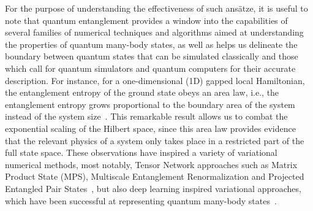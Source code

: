 \documentclass[
 aps,
 pra,
 showpacs,
 showkeys,
 superscriptaddress,
 reprint,%
twocolumn,
]{revtex4-1}
\begin{document}
For the purpose of understanding the effectiveness of such ans\"atze, it is useful to note that quantum entanglement provides a window into the capabilities of several families of numerical techniques and algorithms aimed at understanding the properties of quantum many-body states, as well as helps us delineate the boundary between quantum states that can be simulated classically and those which call for quantum simulators and quantum computers for their accurate description. For instance, for a one-dimensional (1D) gapped local Hamiltonian, the entanglement entropy of the ground state obeys an area law, i.e., the entanglement entropy grows proportional to the boundary area of the system instead of the system size~\cite{Eisert2010arealaw}. This remarkable result allows us to combat the exponential scaling of the Hilbert space, since this area law provides evidence that the relevant physics of a system only takes place in a restricted part of the full state space.  These observations have inspired a variety of variational numerical methods, most notably, Tensor Network approaches such as Matrix Product State (MPS), Multiscale Entanglement Renormalization and Projected Entangled Pair States~\cite{Eisert2013tensornetworks}, but also deep learning inspired variational approaches, which have been successful at representing quantum many-body states~\cite{Carleo2016nqs, Carleo2020autoreg,Carrasquilla2019transformers, HibatAllah2020rnns}.
\end{document}
